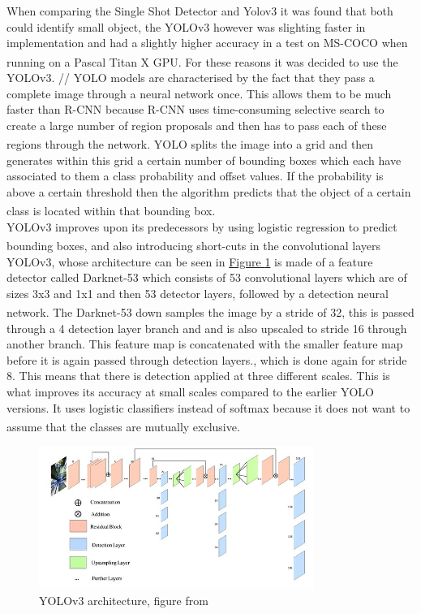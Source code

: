\documentclass[11pt]{article}		%
\newcommand{\supercite}[1]{\textsuperscript{\cite{#1}}}		%
\newcommand{\figref}[1]{\hyperref[#1]{Figure \ref*{#1}}}    %
\begin{document}
	        When comparing the Single Shot Detector and Yolov3 it was found that both could identify small object,  
	        the YOLOv3 however was slighting faster in implementation and had a slightly higher accuracy in a test on MS-COCO when running on a Pascal Titan X GPU.\supercite{YOLO} For these reasons it was decided to use the YOLOv3.
	        //
	        YOLO models are characterised by the fact that they pass a complete image through a neural network once. This allows them to be much faster than R-CNN because R-CNN uses time-consuming selective search to create a large number of region proposals and then has to pass each of these regions through the network.\supercite{YOLO2} \supercite{R-CNN} YOLO splits the image into a grid and then generates within this grid a certain number of bounding boxes which each have associated to them a class probability and offset values. If the probability is above a certain threshold then the algorithm predicts that the object of a certain class is located within that bounding box.\supercite{Object_detection} 
	        \\
	        YOLOv3 improves upon its predecessors by using logistic regression to predict bounding boxes,\supercite{YOLOV3} and also introducing short-cuts in the convolutional layers
	        YOLOv3, whose architecture can be seen in \figref{YOLOv3_image} is made of a feature detector called Darknet-53 which consists of 53 convolutional layers which are of sizes 3x3 and 1x1 and then 53 detector layers, followed by a detection neural network. \supercite{YOLOV3}
	        The Darknet-53 down samples the image by a stride of 32, this is passed through a 4 detection layer branch and and is also upscaled to stride 16 through another branch. This feature map is concatenated with the smaller feature map before it is again passed through detection layers., which is done again for stride 8. This means that there is detection applied at three different scales. This is what improves its accuracy at small scales compared to the earlier YOLO versions. It uses logistic classifiers instead of softmax because it does not want to assume that the classes are mutually exclusive.\supercite{YOLOV3} 
	        	\begin{figure}[h]
				\centering
				\includegraphics[width=0.8\textwidth]{Network-architecture-of-YOLOv3_W640.jpg}
				\caption{YOLOv3 architecture, figure from \cite{YOLOv3_image}}
				\label{YOLOv3_image}
			\end{figure}
\end{document}

